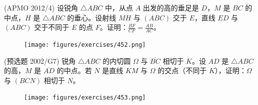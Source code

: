 \begin{exercise}
    (APMO 2012/4) 设锐角 $\triangle ABC$ 中，从点 $A$ 出发的高的垂足是 $D$，$M$ 是 $BC$ 的中点，$H$ 是 $\triangle ABC$ 的垂心。设射线 $MH$ 与 $(ABC)$ 交于 $E$，直线 $ED$ 与 $(ABC)$ 交于不同于 $E$ 的点 $F$。证明：$\frac{BF}{CF} = \frac{AB}{AC}$。
\end{exercise}
\begin{figure}[H]
    \centering
    \texttt{[image: figures/exercises/452.png]}
\end{figure}


\begin{exercise}
    (预选题 2002/G7) 锐角 $\triangle ABC$ 的内切圆 $\Omega$ 与 $\overline{BC}$ 相切于 $K$。设 $AD$ 是 $\triangle ABC$ 的高，$M$ 是 $\overline{AD}$ 的中点。若 $N$ 是直线 $KM$ 与 $\Omega$ 的交点（不同于 $K$），证明：$\Omega$ 与 $(BCN)$ 相切于 $N$。
\end{exercise}
\begin{figure}[H]
    \centering
    \texttt{[image: figures/exercises/453.png]}
\end{figure}